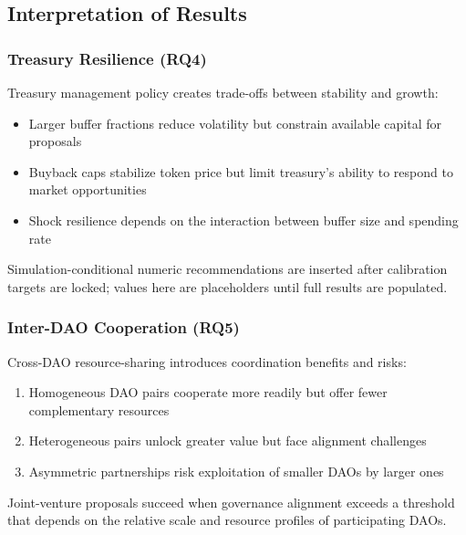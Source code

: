 
\subsection{Interpretation of Results}

\subsubsection{Treasury Resilience (RQ4)}

Treasury management policy creates trade-offs between stability and growth:

\begin{itemize}
    \item Larger buffer fractions reduce volatility but constrain available capital for proposals
    \item Buyback caps stabilize token price but limit treasury's ability to respond to market opportunities
    \item Shock resilience depends on the interaction between buffer size and spending rate
\end{itemize}

Simulation-conditional numeric recommendations are inserted after calibration targets are locked; values here are placeholders until full results are populated.

\subsubsection{Inter-DAO Cooperation (RQ5)}

Cross-DAO resource-sharing introduces coordination benefits and risks:

\begin{enumerate}
    \item Homogeneous DAO pairs cooperate more readily but offer fewer complementary resources
    \item Heterogeneous pairs unlock greater value but face alignment challenges
    \item Asymmetric partnerships risk exploitation of smaller DAOs by larger ones
\end{enumerate}

Joint-venture proposals succeed when governance alignment exceeds a threshold that depends on the relative scale and resource profiles of participating DAOs.

